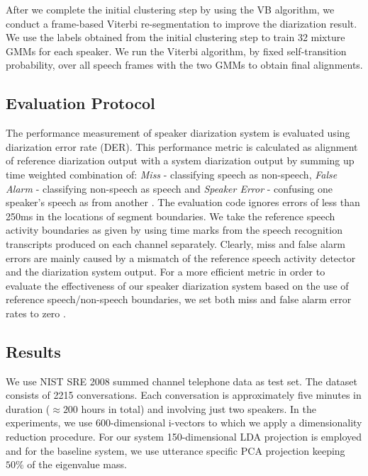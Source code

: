 \documentclass{article}
\begin{document}
After we complete the initial clustering step by using the VB algorithm, we conduct a frame-based Viterbi re-segmentation to improve the diarization result. We use the labels obtained from the initial clustering step to train 32 mixture GMMs for each speaker. We run the Viterbi algorithm, by fixed self-transition probability, over all speech frames with the two GMMs to obtain final alignments.


\subsection{Evaluation Protocol}
\label{eval_protocol}

The performance measurement of speaker diarization system is evaluated using diarization error rate (DER). This performance metric is calculated as alignment of reference diarization output with a system diarization output by summing up time weighted combination of: {\it Miss} - classifying speech as non-speech, {\it False Alarm} - classifying non-speech as speech and {\it Speaker Error} - confusing one speaker’s speech as from another \cite{mdeval}. The evaluation code ignores errors of less than 250ms in the locations of segment boundaries. We take the reference speech activity boundaries as given by using time marks from the speech recognition transcripts produced on each channel separately. Clearly, miss and false alarm errors are mainly caused by a mismatch of the reference speech activity detector and the diarization system output. For a more efficient metric in order to evaluate the effectiveness of our speaker diarization system based on the use of reference speech/non-speech boundaries, we set both miss and false alarm error rates to zero \cite{kenny2010diarFA, shum2011intraconv}.


\subsection{Results}

We use NIST SRE 2008 summed channel telephone data as test set. The dataset consists of 2215 conversations. Each conversation is approximately five minutes in duration ($\approx200$ hours in total) and involving just two speakers. In the experiments, we use 600-dimensional i-vectors to which we apply a dimensionality reduction procedure. For our system 150-dimensional LDA projection is employed and for the baseline system, we use utterance specific PCA projection keeping $50\%$ of the eigenvalue mass.
\end{document}
